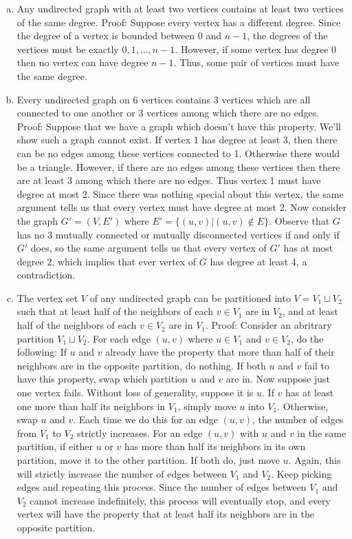 \documentclass{article}
\begin{document}
\begin{enumerate}[a.]
\item Any undirected graph with at least two vertices contains at least two vertices of the same degree.  Proof: Suppose every vertex has a different degree.  Since the degree of a vertex is bounded between 0 and $n-1$, the degrees of the vertices must be exactly $0, 1, \ldots, n-1$.  However, if some vertex has degree 0 then no vertex can have degree $n-1$.  Thus, some pair of vertices must have the same degree. \\

\item Every undirected graph on 6 vertices contains 3 vertices which are all connected to one another or 3 vertices among which there are no edges.  Proof:  Suppose that we have a graph which doesn't have this property.  We'll show such a graph cannot exist.  If vertex 1 has degree at least 3, then there can be no edges among these vertices connected to 1.  Otherwise there would be a triangle.  However, if there are no edges among these vertices then there are at least 3 among which there are no edges.  Thus vertex 1 must have degree at most 2.  Since there was nothing special about this vertex, the same argument tells us that every vertex must have degree at most 2.  Now consider the graph $G' = (V, E')$ where $E' = \{(u,v) | (u,v) \notin E\}$.  Observe that $G$ has no 3 mutually connected or mutually disconnected vertices if and only if $G'$ does, so the same argument tells us that every vertex of $G'$ has at most degree 2, which implies that ever vertex of $G$ has degree at least 4, a contradiction.\\

\item The vertex set $V$ of any undirected graph can be partitioned into $V = V_1 \sqcup V_2$ such that at least half of the neighbors of each $v \in V_1$ are in $V_2$, and at least half of the neighbors of each $v \in V_2$ are in $V_1$.  Proof: Consider an abritrary partition $V_1 \sqcup V_2$.  For each edge $(u,v)$ where $u \in V_1$ and $v \in V_2$, do the following:  If $u$ and $v$ already have the property that more than half of their neighbors are in the opposite partition, do nothing.  If both $u$ and $v$ fail to have this property, swap which partition $u$ and $v$ are in.  Now suppose just one vertex fails.  Without loss of generality, suppose it is $u$.  If $v$ has at least one more than half its neighbors in $V_1$, simply move $u$ into $V_1$.  Otherwise, swap $u$ and $v$.  Each time we do this for an edge $(u,v)$, the number of edges from $V_1$ to $V_2$ strictly increases.  For an edge $(u,v)$ with $u$ and $v$ in the same partition, if either $u$ or $v$ has more than half its neighbors in its own partition, move it to the other partition.  If both do, just move $u$.  Again, this will strictly increase the number of edges between $V_1$ and $V_2$.  Keep picking edges and repeating this process.  Since the number of edges between $V_1$ and $V_2$ cannot increase indefinitely, this process will eventually stop, and every vertex will have the property that at least half its neighbors are in the opposite partition.\\


\end{enumerate}
\end{document}

